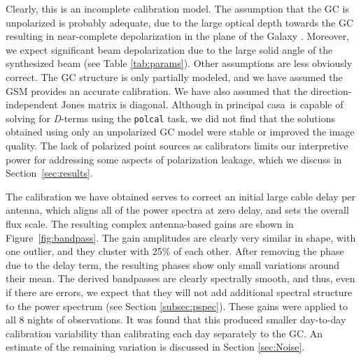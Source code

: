 \documentclass[twocolumn, trackchanges]{aastex61}
\newcommand{\casa}{{\sc casa}}
\begin{document}
{Clearly, this is an incomplete calibration model. 
The assumption that the GC is unpolarized is probably adequate, due to the large optical depth towards the GC \citep{Oppermann.12} resulting in near-complete depolarization in the plane of the Galaxy \citep{Wolleben.06}.  
Moreover, we expect significant beam depolarization due to the large solid angle of the synthesized beam (see Table \ref{tab:params}).
Other assumptions are less obviously correct.
The GC structure is only partially modeled, and we have assumed the GSM provides an accurate calibration.  
We have also assumed that the direction-independent Jones matrix is diagonal.  
Although in principal \casa\ is capable of solving for \textit{D}-terms using the {\tt polcal} task, we did not find that the solutions obtained using only an unpolarized GC model were stable or improved the image quality.  
The lack of polarized point sources as calibrators limits our interpretive power for addressing some aspects of polarization leakage, which we discuss in Section~\ref{sec:results}.

The calibration we have obtained serves to correct an initial large cable delay per antenna, which aligns all of the power spectra at zero delay, and sets the overall flux scale.  
The resulting complex antenna-based gains are shown in Figure~\ref{fig:bandpass}.  The gain amplitudes are clearly very similar in shape, with one outlier, and they cluster with 25\% of each other.  After removing the phase due to the delay term, the resulting phases show only small variations around their mean.  The derived bandpasses are clearly spectrally smooth, and thus, even if there are errors, we expect that they will not add additional spectral structure to the power spectrum (see Section \ref{subsec:pspec}).  These gains were applied to all 8 nights of observations. It was found that this produced smaller day-to-day calibration variability than calibrating each day separately to the GC.  An estimate of the remaining variation is discussed in Section \ref{sec:Noise}.

}
\end{document}
